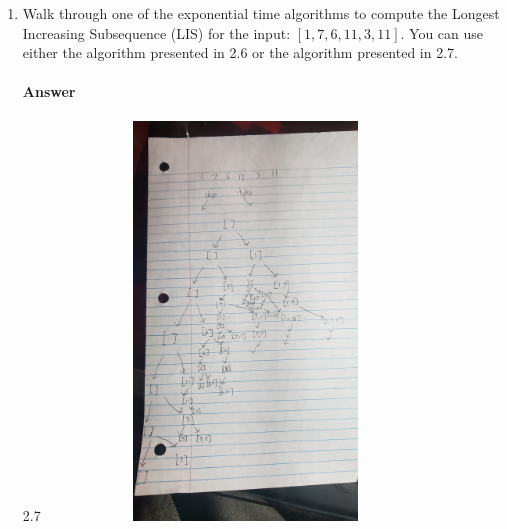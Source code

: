 \documentclass{article}
\begin{document}
\begin{enumerate}
    \item
        Walk through one of the exponential time algorithms to compute the
        Longest Increasing Subsequence (LIS) for the input: $\left[ 1, 7, 6, 11,
        3, 11 \right]$.  You can use either the algorithm presented in 2.6 or
        the algorithm presented in 2.7.

        \paragraph{Answer}
        2.7
        \includegraphics[width=400,height=400,keepaspectratio,angle=-90]{BruteForceLIS.jpg}


\end{enumerate}
\end{document}
